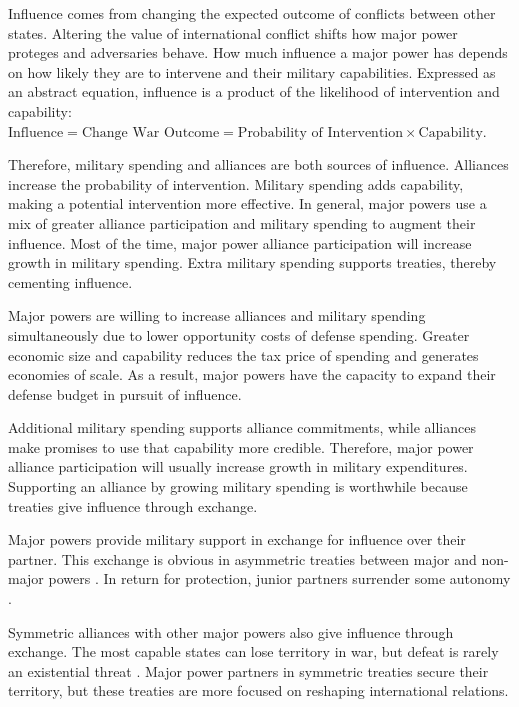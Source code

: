 \documentclass[12pt]{article}
\begin{document}
Influence comes from changing the expected outcome of conflicts between other states.
Altering the value of international conflict shifts how major power proteges and adversaries behave.  
How much influence a major power has depends on how likely they are to intervene and their military capabilities. 
Expressed as an abstract equation, influence is a product of the likelihood of intervention and capability: $\mbox{Influence} = \mbox{Change War Outcome} = \mbox{Probability of Intervention} \times \mbox{Capability}$.


Therefore, military spending and alliances are both sources of influence. 
Alliances increase the probability of intervention. 
Military spending adds capability, making a potential intervention more effective. 
In general, major powers use a mix of greater alliance participation and military spending to augment their influence.
Most of the time, major power alliance participation will increase growth in military spending. 
Extra military spending supports treaties, thereby cementing influence.  


Major powers are willing to increase alliances and military spending simultaneously due to lower opportunity costs of defense spending. 
Greater economic size and capability reduces the tax price of spending and generates economies of scale. 
As a result, major powers have the capacity to expand their defense budget in pursuit of influence.  


Additional military spending supports alliance commitments, while alliances make promises to use that capability more credible. 
Therefore, major power alliance participation will usually increase growth in military expenditures. 
Supporting an alliance by growing military spending is worthwhile because treaties give influence through exchange. 


Major powers provide military support in exchange for influence over their partner. 
This exchange is obvious in asymmetric treaties between major and non-major powers \citep{Morrow1991}. 
In return for protection, junior partners surrender some autonomy \citep{Lake2009}. 


Symmetric alliances with other major powers also give influence through exchange.
The most capable states can lose territory in war, but defeat is rarely an existential threat \citep{Fazal2011}.  
Major power partners in symmetric treaties secure their territory, but these treaties are more focused on reshaping international relations. 
\end{document}
